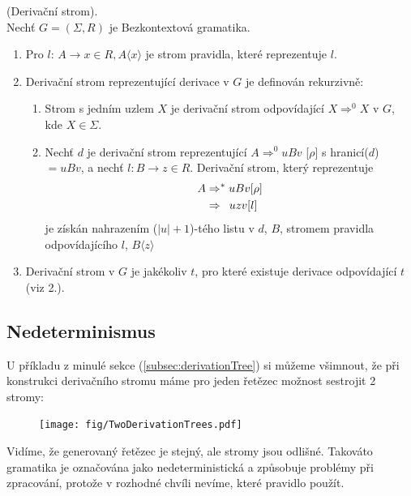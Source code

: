 \begin{defn}
  (Derivační strom). \cite[str. 92]{MedunaIFJ}\\
  Nechť $G = (\Sigma, R)$ je Bezkontextová gramatika.\\
  \begin{enumerate}
    \item Pro $l$: $A \rightarrow x \in R, A\langle x\rangle$ je strom pravidla, které reprezentuje $l$.
    \item Derivační strom reprezentující derivace v $G$ je definován rekurzivně:
    \begin{enumerate}
      \item Strom s jedním uzlem $X$ je derivační strom odpovídající $X \Rightarrow^0 X$ v $G$, kde $X \in \Sigma$.
      \item Nechť $d$ je derivační strom reprezentující
            $A \Rightarrow^0 uBv$ [$\rho$] s hranicí($d$) $ = uBv$, a nechť $l: B \rightarrow z \in R$.
            Derivační strom, který reprezentuje
            \begin{align}
                A & \Rightarrow^* uBv [\rho] \nonumber\\
                  & \Rightarrow \hphantom{*} uzv [l] \nonumber
            \end{align}
            je získán nahrazením ($|u|+1$)-tého listu v $d$, $B$, stromem pravidla odpovídajícího $l$, $B\langle z\rangle$
    \end{enumerate}
    \item Derivační strom v $G$ je jakékoliv $t$, pro které existuje derivace odpovídající $t$ (viz 2.).
  \end{enumerate}
  \vspace{-0.2cm}
\end{defn}

\subsection{Nedeterminismus}
\label{subec:nondeterminsm}

U příkladu z minulé sekce (\ref{subsec:derivationTree}) si můžeme všimnout,
že při konstrukci derivačního stromu máme pro jeden řetězec možnost sestrojit
2 stromy:

\begin{figure}[H]
  \centering
  \texttt{[image: fig/TwoDerivationTrees.pdf]}
\end{figure}

Vidíme, že generovaný řetězec je stejný, ale stromy jsou odlišné.
Takováto gramatika je označována jako nedeterministická a způsobuje problémy při
zpracování, protože v rozhodné chvíli nevíme, které pravidlo použít.\\

